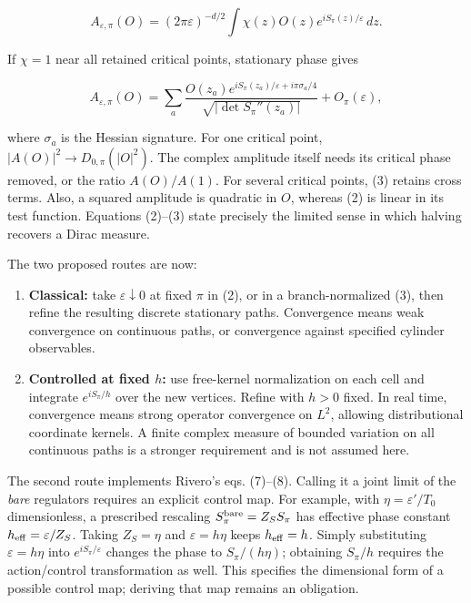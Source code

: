 \documentclass[11pt,a4paper]{article}
\newcommand{\tightlist}{\setlength{\itemsep}{0pt}\setlength{\parskip}{0pt}}
\begin{document}
\[
A_{\varepsilon,\pi}(O)=
(2\pi\varepsilon)^{-d/2}\int\chi(z)O(z)e^{iS_\pi(z)/\varepsilon}\,dz.
\]

If \(\chi=1\) near all retained critical points, stationary phase gives

\[
A_{\varepsilon,\pi}(O)=
\sum_a\frac{O(z_a)e^{iS_\pi(z_a)/\varepsilon+i\pi\sigma_a/4}}
{\sqrt{|\det S_\pi''(z_a)|}}+O_\pi(\varepsilon), \tag{3}
\]

where \(\sigma_a\) is the Hessian signature. For one critical point,
\(|A(O)|^2\to D_{0,\pi}(|O|^2)\). The complex amplitude itself needs its
critical phase removed, or the ratio \(A(O)/A(1)\). For several critical
points, (3) retains cross terms. Also, a squared amplitude is quadratic
in \(O\), whereas (2) is linear in its test function. Equations (2)--(3)
state precisely the limited sense in which halving recovers a Dirac
measure.

The two proposed routes are now:

\begin{enumerate}
\def\labelenumi{\arabic{enumi}.}
\tightlist
\item
  \textbf{Classical:} take \(\varepsilon\downarrow0\) at fixed \(\pi\)
  in (2), or in a branch-normalized (3), then refine the resulting
  discrete stationary paths. Convergence means weak convergence on
  continuous paths, or convergence against specified cylinder
  observables.
\item
  \textbf{Controlled at fixed \(h\):} use free-kernel normalization on
  each cell and integrate \(e^{iS_\pi/h}\) over the new vertices. Refine
  with \(h>0\) fixed. In real time, convergence means strong operator
  convergence on \(L^2\), allowing distributional coordinate kernels. A
  finite complex measure of bounded variation on all continuous paths is
  a stronger requirement and is not assumed here.
\end{enumerate}

The second route implements Rivero's eqs. (7)--(8). Calling it a joint
limit of the \emph{bare} regulators requires an explicit control map.
For example, with \(\eta=\varepsilon'/T_0\) dimensionless, a prescribed
rescaling \(S_\pi^{\rm bare}=Z_S S_\pi\) has effective phase constant
\(h_{\rm eff}=\varepsilon/Z_S\). Taking \(Z_S=\eta\) and
\(\varepsilon=h\eta\) keeps \(h_{\rm eff}=h\). Simply substituting
\(\varepsilon=h\eta\) into \(e^{iS_\pi/\varepsilon}\) changes the phase
to \(S_\pi/(h\eta)\); obtaining \(S_\pi/h\) requires the action/control
transformation as well. This specifies the dimensional form of a
possible control map; deriving that map remains an obligation.
\end{document}
